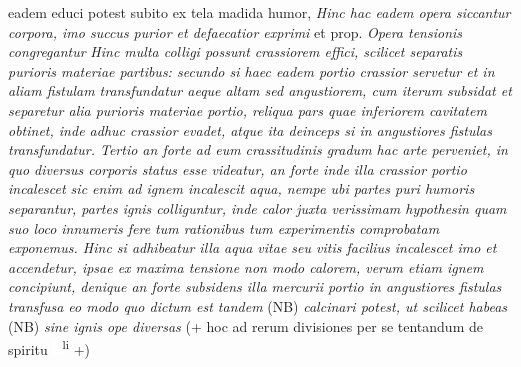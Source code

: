 eadem educi potest subito ex tela madida humor,  \textit{Hinc hac eadem opera siccantur corpora, imo succus purior et defaecatior exprimi } et prop.  \textit{Opera tensionis congregantur }
\textit{Hinc multa colligi possunt }
\textit{crassiorem effici, scilicet separatis purioris materiae partibus: secundo si haec eadem portio crassior servetur et in aliam fistulam transfundatur aeque altam sed angustiorem, cum iterum subsidat et separetur alia purioris materiae portio, reliqua pars quae inferiorem cavitatem obtinet, inde adhuc crassior evadet, atque ita deinceps si in angustiores fistulas transfundatur. Tertio an forte ad eum crassitudinis gradum hac arte perveniet, in quo diversus corporis status esse videatur, an forte inde illa crassior portio incalescet sic enim ad ignem incalescit aqua, nempe ubi partes puri humoris separantur, partes ignis colliguntur, inde calor juxta verissimam hypothesin quam suo loco innumeris fere tum rationibus tum experimentis comprobatam exponemus. Hinc si adhibeatur illa aqua vitae seu vitis facilius incalescet imo et accendetur,  ipsae ex maxima tensione non modo calorem, verum etiam ignem concipiunt, denique an forte subsidens illa mercurii portio in angustiores fistulas\protect{} transfusa eo modo quo dictum est tandem} (NB)
\textit{calcinari potest, ut scilicet habeas} (NB) \textit{sine ignis ope diversas } (+ hoc ad rerum divisiones per se tentandum de spiritu 
\protect\includegraphics[width=0.02\textwidth]{images/vitriol.pdf}\textsuperscript{li}\protect{} +)
